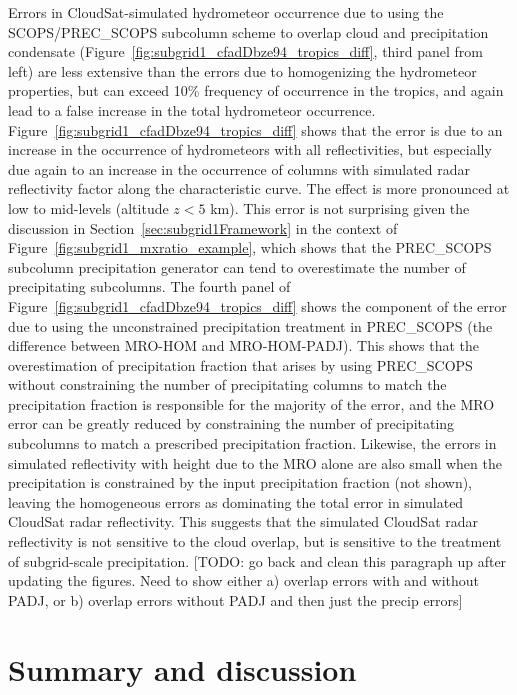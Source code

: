 Errors in CloudSat-simulated hydrometeor occurrence due to using the
SCOPS/PREC\_SCOPS subcolumn scheme to overlap cloud and precipitation
condensate (Figure~\ref{fig:subgrid1_cfadDbze94_tropics_diff}, third
panel from left) are less extensive than the errors due to homogenizing
the hydrometeor properties, but can exceed 10\% frequency of occurrence
in the tropics, and again lead to a false increase in the total
hydrometeor occurrence.
Figure~\ref{fig:subgrid1_cfadDbze94_tropics_diff} shows that the error
is due to an increase in the occurrence of hydrometeors with all
reflectivities, but especially due again to an increase in the
occurrence of columns with simulated radar reflectivity factor along the
characteristic curve. The effect is more pronounced at low to mid-levels
(altitude \(z < 5\) km). This error is not surprising given the
discussion in Section~\ref{sec:subgrid1Framework} in the context of
Figure~\ref{fig:subgrid1_mxratio_example}, which shows that the
PREC\_SCOPS subcolumn precipitation generator can tend to overestimate
the number of precipitating subcolumns. The fourth panel of
Figure~\ref{fig:subgrid1_cfadDbze94_tropics_diff} shows the component of
the error due to using the unconstrained precipitation treatment in
PREC\_SCOPS (the difference between MRO-HOM and MRO-HOM-PADJ). This
shows that the overestimation of precipitation fraction that arises by
using PREC\_SCOPS without constraining the number of precipitating
columns to match the precipitation fraction is responsible for the
majority of the error, and the MRO error can be greatly reduced by
constraining the number of precipitating subcolumns to match a
prescribed precipitation fraction. Likewise, the errors in simulated
reflectivity with height due to the MRO alone are also small when the
precipitation is constrained by the input precipitation fraction (not
shown), leaving the homogeneous errors as dominating the total error in
simulated CloudSat radar reflectivity. This suggests that the simulated
CloudSat radar reflectivity is not sensitive to the cloud overlap, but
is sensitive to the treatment of subgrid-scale precipitation. {[}TODO:
go back and clean this paragraph up after updating the figures. Need to
show either a) overlap errors with and without PADJ, or b) overlap
errors without PADJ and then just the precip errors{]}

\section{Summary and discussion}\label{sec:subgrid1Summary}

